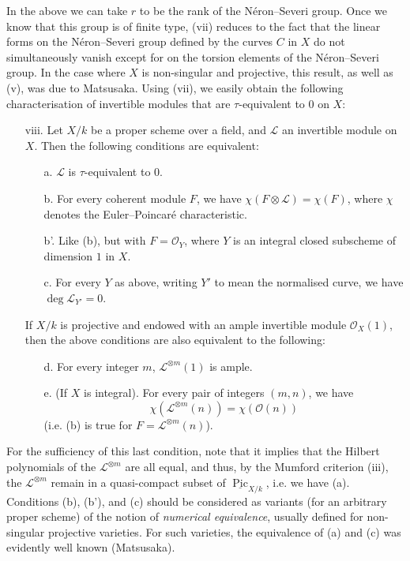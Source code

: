 \begin{remark}
    In the above we can take $r$ to be the rank of the Néron–Severi group.
    Once we know that this group is of finite type, (vii) reduces to the fact that the linear forms on the Néron–Severi group defined by the curves $C$ in $X$ do not simultaneously vanish except for on the torsion elements of the Néron–Severi group.
    In the case where $X$ is non-singular and projective, this result, as well as (v), was due to Matsusaka.
    Using (vii), we easily obtain the following characterisation of invertible modules that are $\tau$-equivalent to $0$ on $X$:

    \begin{enumerate}
        \item [viii.] Let $X/k$ be a proper scheme over a field, and $\mathcal{L}$ an invertible module on $X$.
              Then the following conditions are equivalent:
              \begin{enumerate}
                  \item[a.] $\mathcal{L}$ is $\tau$-equivalent to $0$.
                  \item[b.] For every coherent module $F$, we have $\chi(F\otimes\mathcal{L})=\chi(F)$, where $\chi$ denotes the Euler–Poincaré characteristic.
                  \item[b'.] Like (b), but with $F=\mathcal{O}_Y$, where $Y$ is an integral closed subscheme of dimension $1$ in $X$.
                  \item[c.]  For every $Y$ as above, writing $Y'$ to mean the normalised curve, we have $\deg\mathcal{L}_{Y'}=0$.
              \end{enumerate}
              If $X/k$ is projective and endowed with an ample invertible module $\mathcal{O}_X(1)$, then the above conditions are also equivalent to the following:
              \begin{enumerate}
                  \item[d.] For every integer $m$, $\mathcal{L}^{\otimes m}(1)$ is ample.
                  \item[e.] (If $X$ is integral).
                        For every pair of integers $(m,n)$, we have
                        \[
                            \chi(\mathcal{L}^{\otimes m}(n)) = \chi(\mathcal{O}(n))
                        \]
                        (i.e. (b) is true for $F=\mathcal{L}^{\otimes m}(n)$).
              \end{enumerate}
    \end{enumerate}

    For the sufficiency of this last condition, note that it implies that the Hilbert polynomials of the $\mathcal{L}^{\otimes m}$ are all equal, and thus, by the Mumford criterion (iii), the $\mathcal{L}^{\otimes m}$ remain in a quasi-compact subset of $\underline{\operatorname{Pic}}_{X/k}$, i.e. we have (a).
    Conditions (b), (b'), and (c) should be considered as variants (for an arbitrary proper scheme) of the notion of \emph{numerical equivalence}, usually defined for non-singular projective varieties.
    For such varieties, the equivalence of (a) and (c) was evidently well known (Matsusaka).


\end{remark}
